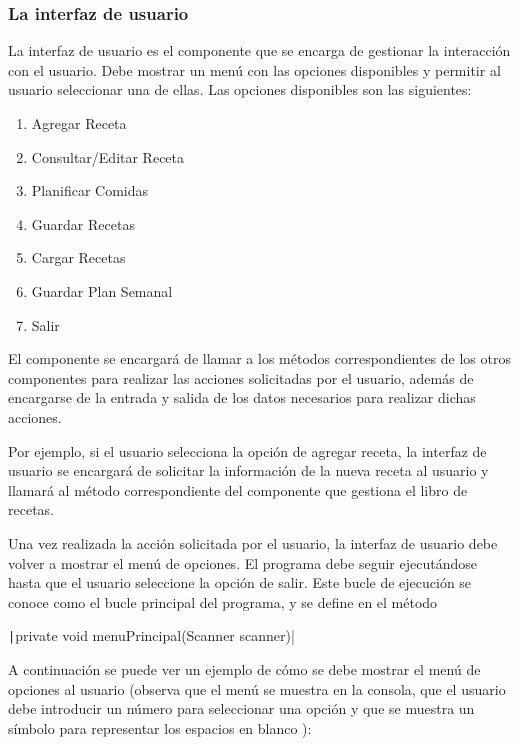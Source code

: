 \documentclass[
    a4paper, %
    12pt, %
]{CSSullivanBusinessReport}
\begin{document}
\subsubsection{La interfaz de usuario}\label{sec:interfaz-usuario}
La interfaz de usuario es el componente que se encarga de gestionar la interacción con el usuario. Debe mostrar un menú con las opciones disponibles y permitir al usuario seleccionar una de ellas. Las opciones disponibles son las siguientes:

\begin{enumerate}
    \item Agregar Receta
    \item Consultar/Editar Receta
    \item Planificar Comidas
    \item Guardar Recetas
    \item Cargar Recetas
    \item Guardar Plan Semanal
    \item Salir
\end{enumerate}

El componente se encargará de llamar a los métodos correspondientes de los otros componentes para realizar las acciones solicitadas por el usuario, además de encargarse de la entrada y salida de los datos necesarios para realizar dichas acciones.

Por ejemplo, si el usuario selecciona la opción de agregar receta, la interfaz de usuario se encargará de solicitar la información de la nueva receta al usuario y llamará al método correspondiente del componente que gestiona el libro de recetas.

Una vez realizada la acción solicitada por el usuario, la interfaz de usuario debe volver a mostrar el menú de opciones. El programa debe seguir ejecutándose hasta que el usuario seleccione la opción de salir. Este bucle de ejecución se conoce como el bucle principal del programa, y se define en el método

\texttt|private void menuPrincipal(Scanner scanner)|

A continuación se puede ver un ejemplo de cómo se debe mostrar el menú de opciones al usuario (observa que el menú se muestra en la consola, que el usuario debe introducir un número para seleccionar una opción y que se muestra un símbolo para representar los espacios en blanco \texttt{\textvisiblespace }):
\end{document}
